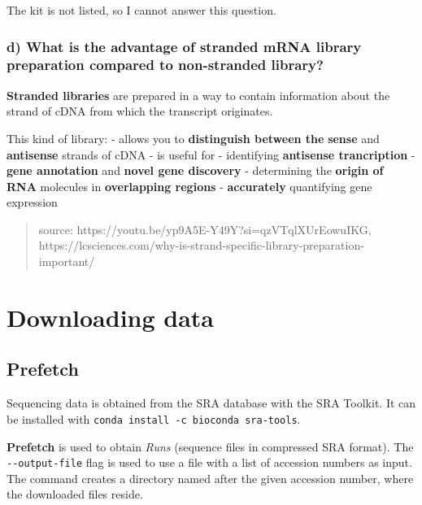 The kit is not listed, so I cannot answer this question.

\hypertarget{d-what-is-the-advantage-of-stranded-mrna-library-preparation-compared-to-non-stranded-library}{%
\subsubsection{d) What is the advantage of stranded mRNA library
preparation compared to non-stranded
library?}\label{d-what-is-the-advantage-of-stranded-mrna-library-preparation-compared-to-non-stranded-library}}

\textbf{Stranded libraries} are prepared in a way to contain information
about the strand of cDNA from which the transcript originates.

This kind of library: - allows you to \textbf{distinguish between the}
\textbf{sense} and \textbf{antisense} strands of cDNA - is useful for -
identifying \textbf{antisense trancription} - \textbf{gene annotation}
and \textbf{novel gene discovery} - determining the \textbf{origin of
RNA} molecules in \textbf{overlapping regions} - \textbf{accurately}
quantifying gene expression

\begin{quote}
source: https://youtu.be/yp9A5E-Y49Y?si=qzVTqlXUrEowuIKG,
https://lcsciences.com/why-is-strand-specific-library-preparation-important/
\end{quote}

\hypertarget{downloading-data}{%
\section{Downloading data}\label{downloading-data}}

\hypertarget{prefetch}{%
\subsection{Prefetch}\label{prefetch}}

Sequencing data is obtained from the SRA database with the SRA Toolkit.
It can be installed with
\texttt{conda\ install\ -c\ bioconda\ sra-tools}.

\begin{Shaded}
\begin{Highlighting}[]
 
\end{Highlighting}
\end{Shaded}

\textbf{Prefetch} is used to obtain \emph{Runs} (sequence files in
compressed SRA format). The \texttt{-\/-output-file} flag is used to use
a file with a list of accession numbers as input. The command creates a
directory named after the given accession number, where the downloaded
files reside.

